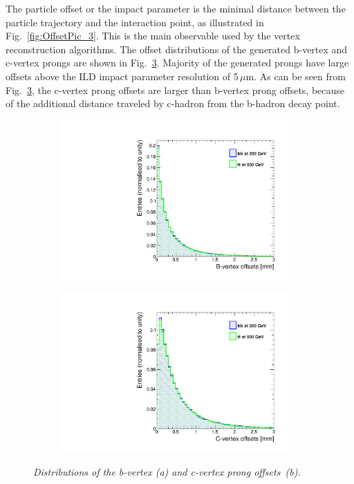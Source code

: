 The particle offset or the impact parameter is the minimal distance between the particle trajectory and the interaction point, as illustrated in Fig.~\ref{fig:OffsetPic_3}.
This is the main observable used by the vertex reconstruction algorithms. 
The offset distributions of the generated b-vertex and c-vertex prongs are shown in Fig.~\ref{fig:GenVtxOffset_3}.
Majority of the generated prongs have large offsets above the ILD impact parameter resolution of 5\,$\mu$m. 
As can be seen from Fig.~\ref{fig:GenVtxOffset_3}, the c-vertex prong offsets are larger than b-vertex prong offsets, because of the additional distance traveled by c-hadron from the b-hadron decay point. 

\begin{figure}
\centering
\begin{subfigure}{0.5\textwidth}
    \includegraphics[width=0.95\textwidth]{ILD/plots/gen-bvtx-offsets.pdf}
\caption{\label{fig:GenVtxOffset_a_3} }
\end{subfigure}%
  \begin{subfigure}{0.5\textwidth}
\centering
    \includegraphics[width=0.95\textwidth]{ILD/plots/gen-cvtx-offsets.pdf}
\caption{\label{fig:GenVtxOffset_b_3} }
\end{subfigure}
    \caption{\sl Distributions of the b-vertex (a) and c-vertex prong offsets~(b). }
    \label{fig:GenVtxOffset_3}
\end{figure}

